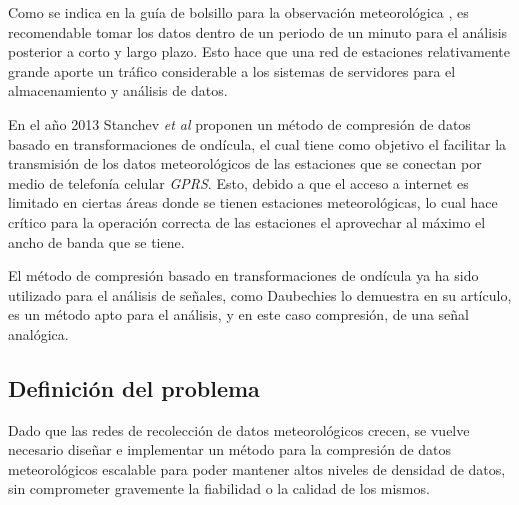 Como se indica en la guía de bolsillo para la observación meteorológica \cite{Handbook_2000}, es recomendable tomar los datos dentro de un periodo de un minuto para el análisis posterior a corto y largo plazo. Esto hace que una red de estaciones relativamente grande aporte un tráfico considerable a los sistemas de servidores para el almacenamiento y análisis de datos.

En el año 2013 Stanchev \textit{et al} \cite{Improved_Stanchev} proponen un método de compresión de datos basado en transformaciones de ondícula, el cual tiene como objetivo el facilitar la transmisión de los datos meteorológicos de las estaciones que se conectan por medio de telefonía celular \textit{GPRS}. Esto, debido a que el acceso a internet es limitado en ciertas áreas donde se tienen estaciones meteorológicas, lo cual hace crítico para la operación correcta de las estaciones el aprovechar al máximo el ancho de banda que se tiene.

El método de compresión basado en transformaciones de ondícula ya ha sido utilizado para el análisis de señales, como Daubechies\cite{daubechies1990wavelet} lo demuestra en su artículo, es un método apto para el análisis, y en este caso compresión, de una señal analógica.

\subsection{Definición del problema}

Dado que las redes de recolección de datos meteorológicos crecen, se vuelve necesario diseñar e implementar un método para la compresión de datos meteorológicos escalable para poder mantener altos niveles de densidad de datos, sin comprometer gravemente la fiabilidad o la calidad de los mismos.
